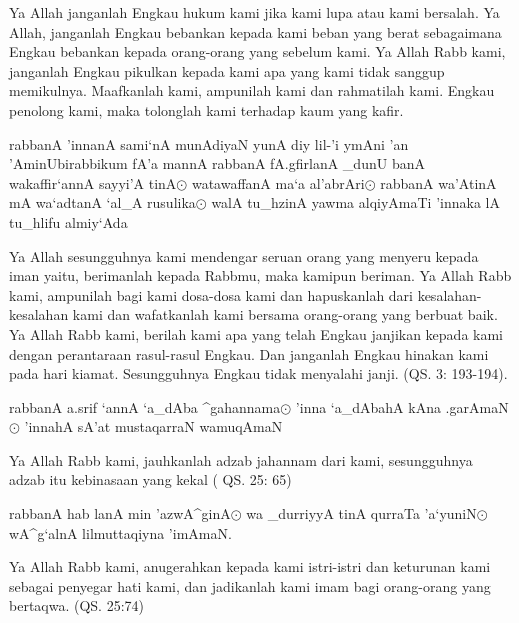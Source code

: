 \documentclass[a4paper,12pt,makeidx]{article}
\begin{document}
\vspace{0.5cm}
Ya Allah janganlah Engkau hukum kami
jika kami lupa atau kami bersalah.
Ya Allah, janganlah Engkau bebankan 
kepada kami beban yang berat sebagaimana
Engkau bebankan kepada orang-orang yang sebelum kami.
Ya Allah Rabb kami, janganlah Engkau pikulkan
kepada kami apa yang kami tidak sanggup memikulnya. Maafkanlah kami, ampunilah kami dan rahmatilah kami.
Engkau penolong kami, maka tolonglah
kami terhadap kaum yang kafir.
    
\vspace{0.5 cm}
\begin{arabtext}
rabbanA 'innanA sami`nA munAdiyaN
yunA diy lil-'i ymAni 'an 'AminUbirabbikum
fA'a mannA rabbanA fA.gfirlanA
_dunU banA wakaffir`annA sayyi'A tinA$\odot$
watawaffanA ma`a al'abrAri$\odot$
rabbanA wa'AtinA mA wa`adtanA `al_A rusulika$\odot$
walA tu_hzinA yawma alqiyAmaTi 
'innaka lA tu_hlifu almiy`Ada
\end{arabtext}

\vspace{0.5cm}
Ya Allah sesungguhnya kami mendengar
seruan orang yang menyeru kepada iman yaitu, 
berimanlah kepada Rabbmu, maka kamipun beriman.
Ya Allah Rabb kami, ampunilah bagi 
kami dosa-dosa kami dan hapuskanlah
dari kesalahan-kesalahan kami
dan wafatkanlah kami bersama 
orang-orang yang berbuat baik.
Ya Allah  Rabb kami, berilah kami 
apa yang telah Engkau janjikan kepada kami 
dengan perantaraan rasul-rasul Engkau. 
Dan janganlah Engkau hinakan kami pada hari kiamat.
Sesungguhnya Engkau tidak menyalahi janji. (QS. 3: 193-194).
    
\vspace{0.5 cm}
\begin{arabtext}
rabbanA a.srif `annA `a_dAba ^gahannama$\odot$
'inna `a_dAbahA kAna .garAmaN$\odot$
'innahA sA'at mustaqarraN wamuqAmaN
\end{arabtext}

\vspace{0.5cm}
Ya Allah Rabb kami, jauhkanlah adzab
jahannam dari kami, sesungguhnya adzab itu 
kebinasaan yang kekal ( QS. 25: 65)
     
\vspace{0.5 cm}
\begin{arabtext}
rabbanA hab lanA min 'azwA^ginA$\odot$ wa _durriyyA tinA
qurraTa 'a`yuniN$\odot$
wA^g`alnA lilmuttaqiyna 'imAmaN.
\end{arabtext}

\vspace{0.5cm}
Ya Allah Rabb kami, anugerahkan kepada kami
istri-istri dan keturunan kami sebagai
penyegar hati kami, dan jadikanlah kami
imam bagi orang-orang yang bertaqwa. (QS. 25:74)
    
\end{document}
